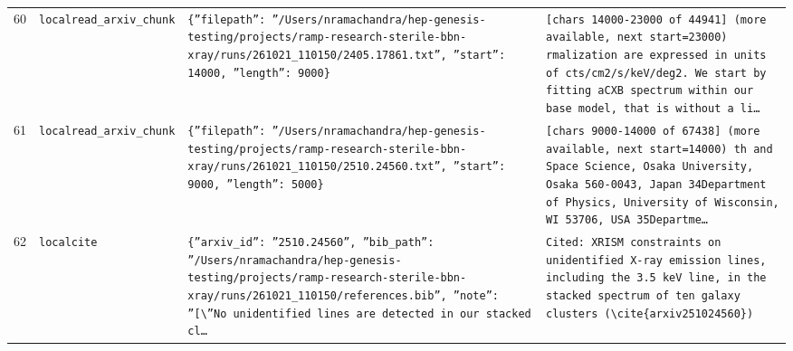 \documentclass[11pt,a4paper]{article}
\begin{document}
\begin{longtable}{@{}p{}p{}p{}p{}@{}}
60 & \texttt{local}\newline\texttt{read\_\allowbreak{}arxiv\_\allowbreak{}chunk} & \texttt{\{''filepath'':\allowbreak{} ''/\allowbreak{}Users/\allowbreak{}nramachandra/\allowbreak{}hep-genesis-testing/\allowbreak{}projects/\allowbreak{}ramp-research-sterile-bbn-xray/\allowbreak{}runs/\allowbreak{}261021\_\allowbreak{}110150/\allowbreak{}2405.17861.txt'',\allowbreak{} ''start'':\allowbreak{} 14000,\allowbreak{} ''length'':\allowbreak{} 9000\}\allowbreak{}} & \texttt{[chars 14000-23000 of 44941]\allowbreak{} (more available,\allowbreak{} next start=\allowbreak{}23000)\allowbreak{}  rmalization are expressed in units of cts/\allowbreak{}cm2/\allowbreak{}s/\allowbreak{}keV/\allowbreak{}deg2. We start by fitting aCXB spectrum within our base model,\allowbreak{} that is without a li\ldots{}\allowbreak{}} \\
61 & \texttt{local}\newline\texttt{read\_\allowbreak{}arxiv\_\allowbreak{}chunk} & \texttt{\{''filepath'':\allowbreak{} ''/\allowbreak{}Users/\allowbreak{}nramachandra/\allowbreak{}hep-genesis-testing/\allowbreak{}projects/\allowbreak{}ramp-research-sterile-bbn-xray/\allowbreak{}runs/\allowbreak{}261021\_\allowbreak{}110150/\allowbreak{}2510.24560.txt'',\allowbreak{} ''start'':\allowbreak{} 9000,\allowbreak{} ''length'':\allowbreak{} 5000\}\allowbreak{}} & \texttt{[chars 9000-14000 of 67438]\allowbreak{} (more available,\allowbreak{} next start=\allowbreak{}14000)\allowbreak{}  th and Space Science,\allowbreak{} Osaka University,\allowbreak{} Osaka 560-0043,\allowbreak{} Japan 34Department of Physics,\allowbreak{} University of Wisconsin,\allowbreak{} WI 53706,\allowbreak{} USA 35Departme\ldots{}\allowbreak{}} \\
62 & \texttt{local}\newline\texttt{cite} & \texttt{\{''arxiv\_\allowbreak{}id'':\allowbreak{} ''2510.24560'',\allowbreak{} ''bib\_\allowbreak{}path'':\allowbreak{} ''/\allowbreak{}Users/\allowbreak{}nramachandra/\allowbreak{}hep-genesis-testing/\allowbreak{}projects/\allowbreak{}ramp-research-sterile-bbn-xray/\allowbreak{}runs/\allowbreak{}261021\_\allowbreak{}110150/\allowbreak{}references.bib'',\allowbreak{} ''note'':\allowbreak{} ''[\textbackslash{}\allowbreak{}''No unidentified lines are detected in our stacked cl\ldots{}\allowbreak{}} & \texttt{Cited:\allowbreak{} XRISM constraints on unidentified X-ray emission lines,\allowbreak{} including the 3.5 keV line,\allowbreak{} in the stacked spectrum of ten galaxy clusters (\textbackslash{}\allowbreak{}cite\{arxiv251024560\}\allowbreak{})\allowbreak{}} \\

\end{longtable}
\end{document}

